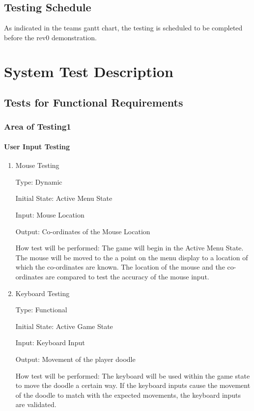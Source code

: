 \documentclass[12pt, titlepage]{article}
\begin{document}
\subsection{Testing Schedule}
		
As indicated in the teams gantt chart, the testing is scheduled to be completed before the rev0 demonstration.

\section{System Test Description}
	
\subsection{Tests for Functional Requirements}

\subsubsection{Area of Testing1}
		
\paragraph{User Input Testing}

\begin{enumerate}

\item{Mouse Testing\\}

Type: Dynamic
					
Initial State: Active Menu State
					
Input: Mouse Location
					
Output: Co-ordinates of the Mouse Location
					
How test will be performed: The game will begin in the Active Menu State. The mouse will be moved to the a point on the menu display to a location of which the co-ordinates are known. The location of the mouse and the co-ordinates are compared to test the accuracy of the mouse input. 
					
\item{Keyboard Testing\\}

Type: Functional
					
Initial State: Active Game State
					
Input: Keyboard Input
					
Output: Movement of the player doodle
					
How test will be performed: The keyboard will be used within the game state to move the doodle a certain way. If the keyboard inputs cause the movement of the doodle to match with the expected movements, the keyboard inputs are validated.

\end{enumerate}
\end{document}
